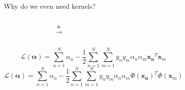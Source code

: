 \documentclass[9.5pt]{beamer}
\begin{document}
    \begin{frame}{Why do we even need kernels?}
        \begin{columns}[onlytextwidth]
            \begin{figure}
                \centering
            \end{figure}
            \LARGE
            \[\mathbf{\xrightarrow{\phi}}\]
            \begin{figure}
                \centering
            \end{figure}
        \end{columns}
        \bigskip
        \begin{columns}[onlytextwidth]
            \tiny
            \[\mathcal{L}(\mathbf{\alpha}) = \sum_{n=1}^{N} \alpha_n-\frac{1}{2}\sum_{n=1}^{N}\sum_{m=1}^{N} y_ny_m\alpha_n\alpha_m\mathbf{x_n}^T \mathbf{x}_m\]
            \tiny
            \[\mathcal{L}(\mathbf{\alpha}) = \sum_{n=1}^{N} \alpha_n-\frac{1}{2}\sum_{n=1}^{N}\sum_{m=1}^{N} y_ny_m\alpha_n\alpha_m\Phi(\mathbf{x_n})^T \Phi( \mathbf{x}_m)\]
        \end{columns}
    \end{frame}
\end{document}

